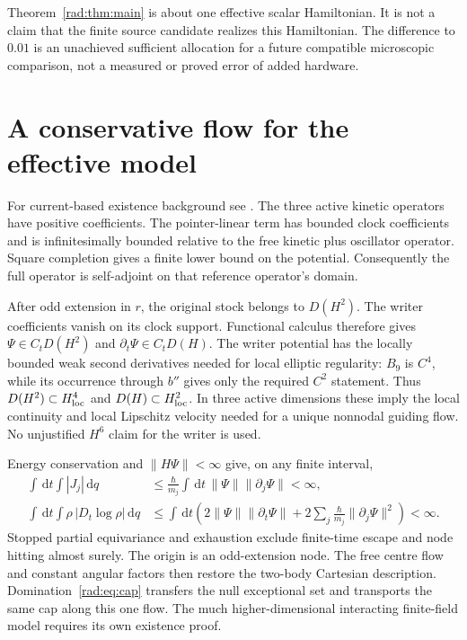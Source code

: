 \documentclass[11pt]{article}
\theoremstyle{definition}\newtheorem{definition}[theorem]{Definition}
\theoremstyle{remark}\newtheorem{remark}[theorem]{Remark}
\newcommand{\dd}{\,\mathrm d}\newcommand{\Imv}{\operatorname{Im}}\newcommand{\ii}{\mathrm i}
\begin{document}
Theorem~\ref{rad:thm:main} is about one effective scalar Hamiltonian. It is
not a claim that the finite source candidate realizes this Hamiltonian.
The difference to $0.01$ is an unachieved sufficient allocation for a
future compatible microscopic comparison, not a measured or proved error
of added hardware.

\section{A conservative flow for the effective model}

For current-based existence background see \cite{TT}. The three active kinetic operators have positive coefficients. The
pointer-linear term has bounded clock coefficients and is infinitesimally
bounded relative to the free kinetic plus oscillator operator. Square
completion gives a finite lower bound on the potential. Consequently
the full operator is self-adjoint on that reference operator's domain.

After odd extension in $r$, the original stock belongs to $D(H^2)$.
The writer coefficients vanish on its clock support. Functional calculus
therefore gives $\Psi\in C_tD(H^2)$ and $\partial_t\Psi\in C_tD(H)$.
The writer potential has the locally bounded weak second derivatives
needed for local elliptic regularity: $B_9$ is $C^4$, while its occurrence
through $b''$ gives only the required $C^2$ statement. Thus
$D(H^2)\subset H^4_{\rm loc}$ and $D(H)\subset H^2_{\rm loc}$.
In three active dimensions these imply the local continuity and local
Lipschitz velocity needed for a unique nonnodal guiding flow. No unjustified
$H^6$ claim for the writer is used.

Energy conservation and $\|H\Psi\|<\infty$ give, on any finite interval,
\begin{align*}
 \int\!\dd t\int |J_j|\dd q
 &\leq\frac{\hbar}{m_j}\int\!\dd t\,\|\Psi\|\|\partial_j\Psi\|<\infty,\\
 \int\!\dd t\int \rho\,|D_t\log\rho|\dd q
 &\leq\int\!\dd t\left(2\|\Psi\|\|\partial_t\Psi\|
       +2\sum_j\frac{\hbar}{m_j}\|\partial_j\Psi\|^2\right)<\infty.
\end{align*}
Stopped partial equivariance and exhaustion exclude finite-time escape
and node hitting almost surely. The origin is an odd-extension node.
The free centre flow and constant angular factors then restore the
two-body Cartesian description. Domination~\eqref{rad:eq:cap} transfers
the null exceptional set and transports the same cap along this one flow.
The much higher-dimensional interacting finite-field model requires its
own existence proof.
\end{document}
